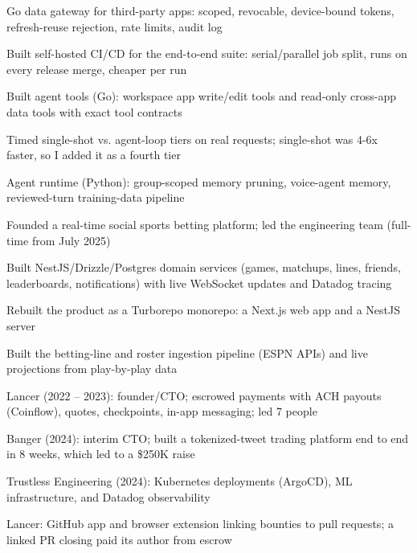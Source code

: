 \documentclass[print]{jack-resume}
\begin{document}
\begin{tightemize}
    \item Go data gateway for third-party apps: scoped, revocable, device-bound tokens, refresh-reuse rejection, rate limits, audit log
    \item Built self-hosted CI/CD for the end-to-end suite: serial/parallel job split, runs on every release merge, cheaper per run
    \item Built agent tools (Go): workspace app write/edit tools and read-only cross-app data tools with exact tool contracts
    \item Timed single-shot vs. agent-loop tiers on real requests; single-shot was 4-6x faster, so I added it as a fourth tier
    \item Agent runtime (Python): group-scoped memory pruning, voice-agent memory, reviewed-turn training-data pipeline
\end{tightemize}
\sectionsep

\begin{tightemize}
    \item Founded a real-time social sports betting platform; led the engineering team (full-time from July 2025)
    \item Built NestJS/Drizzle/Postgres domain services (games, matchups, lines, friends, leaderboards, notifications) with live WebSocket updates and Datadog tracing
    \item Rebuilt the product as a Turborepo monorepo: a Next.js web app and a NestJS server
    \item Built the betting-line and roster ingestion pipeline (ESPN APIs) and live projections from play-by-play data
\end{tightemize}
\sectionsep

\begin{tightemize}
    \item Lancer (2022 -- 2023): founder/CTO; escrowed payments with ACH payouts (Coinflow), quotes, checkpoints, in-app messaging; led 7 people
    \item Banger (2024): interim CTO; built a tokenized-tweet trading platform end to end in 8 weeks, which led to a \$250K raise
    \item Trustless Engineering (2024): Kubernetes deployments (ArgoCD), ML infrastructure, and Datadog observability
    \item Lancer: GitHub app and browser extension linking bounties to pull requests; a linked PR closing paid its author from escrow
\end{tightemize}
\sectionsep
\end{document}
